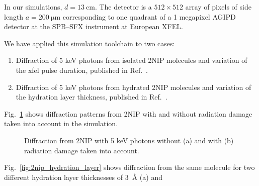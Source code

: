 \documentclass[10pt]{scrartcl}
\begin{document}
In our simulations, $d=\SI{13}{\centi\metre}$. The
detector is a $512\times512$ array of pixels of side length
$a=\SI{200}{\micro\metre}$ corresponding to one quadrant of a 1 megapixel AGIPD
detector \cite{Allahgholi2015} at the SPB--SFX instrument at European XFEL.

We have applied this simulation toolchain to two cases:
\begin{enumerate}
  \item Diffraction of 5 keV photons from isolated 2NIP molecules and variation
    of the \gls{xfel} pulse duration, published in Ref.~\cite{Fortmann-Grote2017}.
  \item Diffraction of 5 keV photons from hydrated 2NIP molecules and variation
    of the hydration layer thickness, published in
    Ref.~\cite{Fortmann-Grote2017b}.
\end{enumerate}
Fig.~\ref{fig:2nip_diffraction_RD_vs_noRD} shows diffraction patterns from
2NIP with and without radiation damage taken into account in the simulation.
%
\begin{figure}[ht]
  \begin{center}
  \end{center}
  \caption{Diffraction from 2NIP with 5 keV photons without (a) and with (b)
  radiation damage taken into account.}
  \label{fig:2nip_diffraction_RD_vs_noRD}
\end{figure}
%
Fig.~\ref{fig:2nip_hydration_layer} shows diffraction from the same molecule for
two different hydration layer thicknesses of \SI{3}{\angstrom} (a) and
\end{document}
